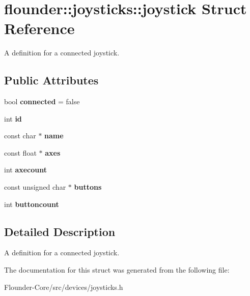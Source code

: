 \hypertarget{structflounder_1_1joysticks_1_1joystick}{}\section{flounder\+:\+:joysticks\+:\+:joystick Struct Reference}
\label{structflounder_1_1joysticks_1_1joystick}


A definition for a connected joystick.  


\subsection*{Public Attributes}
\begin{DoxyCompactItemize}
\item 
\mbox{\label{structflounder_1_1joysticks_1_1joystick_aab4c67ee2724a9826754662ca864f8e2}} 
bool {\bfseries connected} = false
\item 
\mbox{\label{structflounder_1_1joysticks_1_1joystick_adac353f8690ff9778414b7acffbc9c30}} 
int {\bfseries id}
\item 
\mbox{\label{structflounder_1_1joysticks_1_1joystick_abb67b19fa449da0f7c85390dd81e4f6b}} 
const char $\ast$ {\bfseries name}
\item 
\mbox{\label{structflounder_1_1joysticks_1_1joystick_ae0ba6372eb1dbea65f7ba48f9da3ae62}} 
const float $\ast$ {\bfseries axes}
\item 
\mbox{\label{structflounder_1_1joysticks_1_1joystick_a27ad5b99b97a042503e747469c3e1edc}} 
int {\bfseries axecount}
\item 
\mbox{\label{structflounder_1_1joysticks_1_1joystick_ac22932511f47b7f2bd76c8e33607003c}} 
const unsigned char $\ast$ {\bfseries buttons}
\item 
\mbox{\label{structflounder_1_1joysticks_1_1joystick_a0c2236894e920fb527f84636205e7675}} 
int {\bfseries buttoncount}
\end{DoxyCompactItemize}


\subsection{Detailed Description}
A definition for a connected joystick. 



The documentation for this struct was generated from the following file\+:\begin{DoxyCompactItemize}
\item 
Flounder-\/\+Core/src/devices/joysticks.\+h\end{DoxyCompactItemize}
